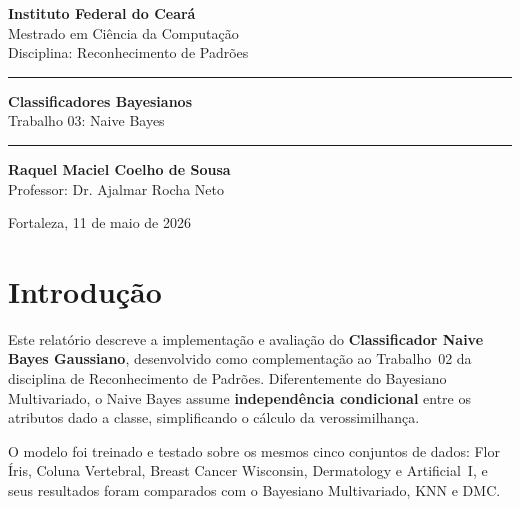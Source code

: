 \documentclass[12pt, a4paper]{article}
\begin{document}

\begin{titlepage}
    \begin{flushleft}
        \Large \textbf{Instituto Federal do Ceará} \\
        \large Mestrado em Ciência da Computação \\
        \small Disciplina: Reconhecimento de Padrões
    \end{flushleft}
    \vspace{4cm}
    \begin{center}
        \hrule\vspace{0.5cm}
        {\huge \textbf{\color{brandblue} Classificadores Bayesianos}}\\
        \vspace{0.2cm}
        {\Large Trabalho 03: Naive Bayes}
        \vspace{0.5cm}\hrule
    \end{center}
    \vspace{3cm}
    \begin{flushright}
        \large \textbf{Raquel Maciel Coelho de Sousa}\\
        \small Professor: Dr. Ajalmar Rocha Neto
    \end{flushright}
    \vfill
    \begin{center}\small Fortaleza, 11 de maio de 2026 \end{center}
\end{titlepage}

\newpage
{\hypersetup{linkcolor=black}\tableofcontents}
\newpage

\section{Introdução}

Este relatório descreve a implementação e avaliação do
\textbf{Classificador Naive Bayes Gaussiano}, desenvolvido como
complementação ao Trabalho~02 da disciplina de Reconhecimento de
Padrões. Diferentemente do Bayesiano Multivariado, o Naive Bayes
assume \textbf{independência condicional} entre os atributos dado
a classe, simplificando o cálculo da verossimilhança.

O modelo foi treinado e testado sobre os mesmos cinco conjuntos de
dados: Flor Íris, Coluna Vertebral, Breast Cancer Wisconsin,
Dermatology e Artificial~I, e seus resultados foram comparados com
o Bayesiano Multivariado, KNN e DMC.
\end{document}
